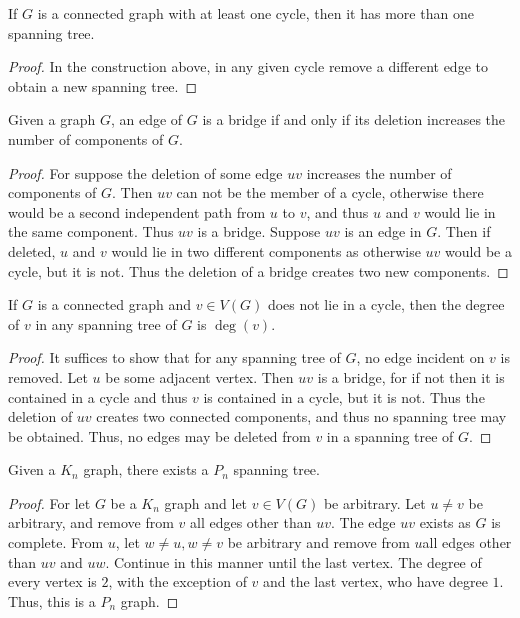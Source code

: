 \documentclass[crop=false,class=book,oneside]{standalone}
\begin{document}
\begin{corollary}
If $G$ is a connected graph with at least one cycle, then it has more than one spanning tree.
\end{corollary}
\begin{proof}
In the construction above, in any given cycle remove a different edge to obtain a new spanning tree.
\end{proof}
\begin{theorem}
Given a graph $G$, an edge of $G$ is a bridge if and only if its deletion increases the number of components of $G$.
\end{theorem}
\begin{proof}
For suppose the deletion of some edge $uv$ increases the number of components of $G$. Then $uv$ can not be the member of a cycle, otherwise there would be a second independent path from $u$ to $v$, and thus $u$ and $v$ would lie in the same component. Thus $uv$ is a bridge. Suppose $uv$ is an edge in $G$. Then if deleted, $u$ and $v$ would lie in two different components as otherwise $uv$ would be a cycle, but it is not. Thus the deletion of a bridge creates two new components.
\end{proof}
\begin{corollary}
If $G$ is a connected graph and $v\in V(G)$ does not lie in a cycle, then the degree of $v$ in any spanning tree of $G$ is $\deg(v)$.
\end{corollary}
\begin{proof}
It suffices to show that for any spanning tree of $G$, no edge incident on $v$ is removed. Let $u$ be some adjacent vertex. Then $uv$ is a bridge, for if not then it is contained in a cycle and thus $v$ is contained in a cycle, but it is not. Thus the deletion of $uv$ creates two connected components, and thus no spanning tree may be obtained. Thus, no edges may be deleted from $v$ in a spanning tree of $G$.
\end{proof}
\begin{theorem}
Given a $K_n$ graph, there exists a $P_n$ spanning tree.
\end{theorem}
\begin{proof}
For let $G$ be a $K_n$ graph and let $v\in V(G)$ be arbitrary. Let $u\ne v$ be arbitrary, and remove from $v$ all edges other than $uv$. The edge $uv$ exists as $G$ is complete. From $u$, let $w\ne u, w\ne v$ be arbitrary and remove from $u$all edges other than $uv$ and $uw$. Continue in this manner until the last vertex. The degree of every vertex is $2$, with the exception of $v$ and the last vertex, who have degree $1$. Thus, this is a $P_n$ graph.
\end{proof}
\end{document}

